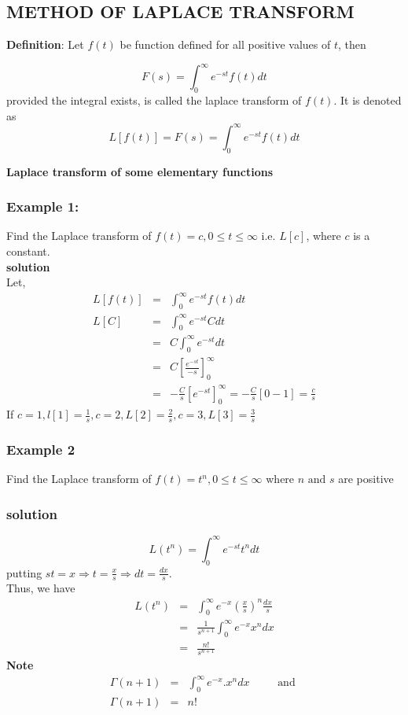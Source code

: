 \documentclass[12pt]{report}
\begin{document}
\subsection{METHOD OF LAPLACE TRANSFORM}
\textbf{Definition}: Let $f(t)$ be function defined for all positive values of $t$, then

\begin{equation}
F(s)= \int^\infty_0 e^{-st}f(t)dt
\end{equation}
provided the integral exists, is called the laplace transform of $f(t)$. It is denoted as
\begin{equation}
L[f(t)]=F(s)= \int^\infty_0 e^{-st}f(t)dt
\end{equation}

\textbf{Laplace transform of some elementary functions}
\subsubsection{Example 1:} Find the Laplace transform of $f(t)=c, 0 \leq t \leq \infty$ i.e. $L[c]$, where $c$ is a constant.
\\ \textbf{solution} \\
Let,
\begin{eqnarray}
L[f(t)]&=&\int^\infty_0 e^{-st}f(t)dt \\
L[C]&=&\int^\infty_0 e^{-st}C dt \nonumber \\
&=& C\int^\infty_0 e^{-st}dt \nonumber\\
&=& C \left[\frac{e^{-st}}{-s} \right]_0^\infty \nonumber\\
&=& -\frac{C}{s} \left[e^{-st}\right]_0^\infty = -\frac{C}{s}\left[0-1\right]= \frac{c}{s}
\end{eqnarray}
If $c=1, l[1]= \frac{1}{s}, c=2, L[2] = \frac{2}{s}, c=3, L[3]=\frac{3}{s}$
\subsubsection{Example 2}
Find the Laplace transform of $f(t)=t^n, 0 \leq t \leq \infty $ where $n \mbox{ and } s$ are positive
\subsubsection{solution} 
\begin{equation}
L(t^n)= \int_0^\infty e^{-st}t^n dt
\end{equation}
putting $st=x \Rightarrow t=\frac{x}{s} \Rightarrow dt= \frac{dx}{s}$. \\
Thus, we have
\begin{eqnarray}
L(t^n)&=& \int_0^\infty e^{-x}\left(\frac{x}{s}\right)^n \frac{dx}{s} \nonumber\\
&=&\frac{1}{s^{n+1}} \int_0^\infty e^{-x}x^ndx \nonumber\\
&=& \frac{n!}{s^{n+1}}
\end{eqnarray}
\textbf{Note}
\begin{eqnarray}
\Gamma(n+1) &=& \int_0^\infty e^{-x}.x^n dx ~~~~~~~~~~\mbox{ and } \nonumber\\
\Gamma(n+1) &=& n!
\end{eqnarray}
\end{document}
